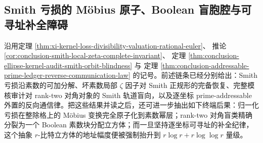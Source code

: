 \subsection{Smith 亏损的 Möbius 原子、Boolean 盲胞腔与可寻址补全障碍}\label{subsec:conclusion-smith-mobius-boolean-primeaddressable-barrier}

沿用定理 \ref{thm:xi-kernel-loss-divisibility-valuation-rational-euler}、
推论 \ref{cor:conclusion-smith-local-zeta-complete-invariant}、
定理 \ref{thm:conclusion-ellipse-kernel-audit-smith-orbit-blindness} 与
定理 \ref{thm:conclusion-addressable-prime-ledger-reverse-communication-law}
的记号。前述链条已经分别给出：Smith 亏损沿素数的可加分解、坏素数局部 \(\zeta\) 因子对 Smith 正规形的完备恢复、完整模核审计对 rank-two 对角对象的 Smith 轨道盲向，以及逐坐标 prime-addressable 外置的反向通信律。把这些结果并读之后，还可进一步抽出如下终端后果：归一化亏损在整除格上的 Möbius 变换完全原子化到素数幂层；rank-two 对角盲类精确分裂为一个 Boolean 素数块分配立方体；而一旦坚持逐坐标可寻址的补全纪律，这个抽象 \(r\)-比特立方体的地址幅度便被强制抬升到 \(r\log r+r\log\log r\) 量级。

